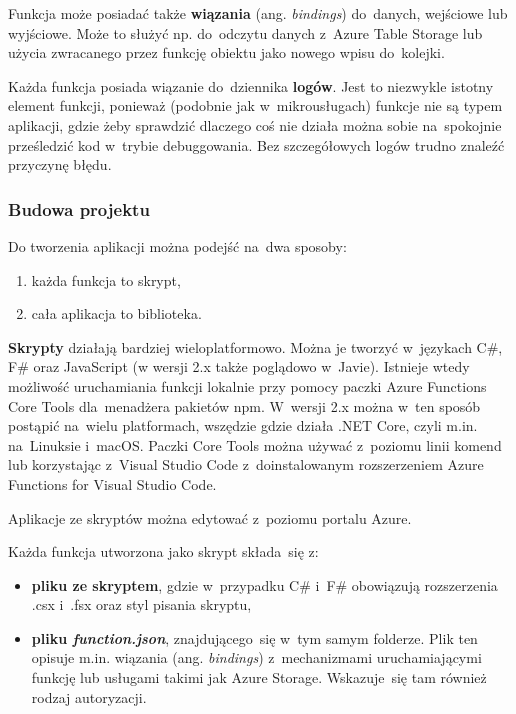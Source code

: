 \documentclass[12pt,a4paper,twoside,titlepage,openright]{book}
\begin{document}
Funkcja może posiadać także \textbf{wiązania} (ang. \textit{bindings}) do~danych, wejściowe lub wyjściowe. Może to służyć np. do~odczytu danych z~Azure Table Storage lub użycia zwracanego przez funkcję obiektu jako nowego wpisu do~kolejki. \cite{siteAppBindings}

Każda funkcja posiada wiązanie do~dziennika \textbf{logów}. Jest to niezwykle istotny element funkcji, ponieważ (podobnie jak w~mikrousługach) funkcje nie są typem aplikacji, gdzie żeby sprawdzić dlaczego coś nie działa można sobie na~spokojnie prześledzić kod w~trybie debuggowania. Bez szczegółowych logów trudno znaleźć przyczynę błędu.

\subsubsection{Budowa projektu}



Do tworzenia aplikacji można podejść na~dwa sposoby: \cite{siteAppLanguages}
\begin{enumerate}
\item każda funkcja to skrypt,
\item cała aplikacja to biblioteka.
\end{enumerate}

\textbf{Skrypty} działają bardziej wieloplatformowo. Można je tworzyć w~językach C\#, F\# oraz JavaScript (w wersji 2.x także poglądowo w~Javie). Istnieje wtedy możliwość uruchamiania funkcji lokalnie przy pomocy paczki Azure Functions Core Tools dla~menadżera pakietów npm. W~wersji 2.x można w~ten sposób postąpić na~wielu platformach, wszędzie gdzie działa .NET Core, czyli m.in. na~Linuksie i~macOS. Paczki Core Tools można używać z~poziomu linii komend lub korzystając z~Visual Studio Code z~doinstalowanym rozszerzeniem Azure Functions for Visual Studio Code.\cite{siteAppLocally} 

Aplikacje ze skryptów można edytować z~poziomu portalu Azure.

Każda funkcja utworzona jako skrypt składa~się z:
\begin{itemize}
\item \textbf{pliku ze skryptem}, gdzie w~przypadku C\# i~F\# obowiązują rozszerzenia .csx i~.fsx oraz styl pisania skryptu,
\item \textbf{pliku \textit{function.json}}, znajdującego~się w~tym samym folderze. Plik ten opisuje m.in. wiązania (ang. \textit{bindings}) z~mechanizmami uruchamiającymi funkcję lub usługami takimi jak Azure Storage. Wskazuje~się tam również rodzaj autoryzacji.
\end{itemize}
\end{document}
